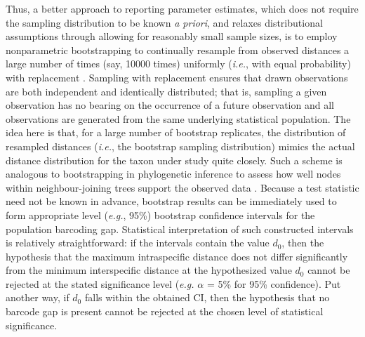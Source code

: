 Thus, a better approach to reporting parameter estimates, which does not require the sampling distribution to be known \textit{a priori}, and relaxes distributional assumptions through allowing for reasonably small sample sizes, is to employ nonparametric bootstrapping to continually resample from observed distances a large number of times (say, 10000 times) uniformly (\textit{i.e.}, with equal probability) with replacement \cite{efron1979boot}. Sampling with replacement ensures that drawn observations are both independent and identically distributed; that is, sampling a given observation has no bearing on the occurrence of a future observation and all observations are generated from the same underlying statistical population. The idea here is that, for a large number of bootstrap replicates, the distribution of resampled distances (\textit{i.e.}, the bootstrap sampling distribution) mimics the actual distance distribution for the taxon under study quite closely. Such a scheme is analogous to bootstrapping in phylogenetic inference to assess how well nodes within neighbour-joining trees support the observed data \cite{efron1996bootstrap, felsenstein1985confidence}. Because a test statistic need not be known in advance, bootstrap results can be immediately used to form appropriate level (\textit{e.g.}, 95\%) bootstrap confidence intervals for the population barcoding gap. Statistical interpretation of such constructed intervals is relatively straightforward: if the intervals contain the value $d_0$, then the \\ hypothesis that the maximum intraspecific distance does not differ significantly from the minimum interspecific distance at the hypothesized value $d_0$ cannot be rejected at the stated significance level (\textit{e.g.} $\alpha$ = 5\% for 95\% confidence). Put another way, if $d_0$ falls within the obtained CI, then the hypothesis that no barcode gap is present cannot be rejected at the chosen level of statistical significance. 



